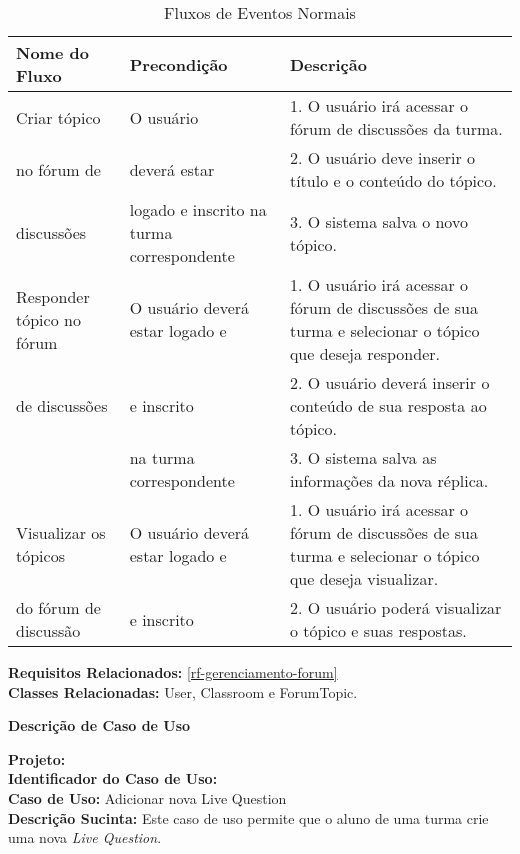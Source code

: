 \begin{table}[H]
	\centering \vspace{0.5cm} \footnotesize
	\caption{Fluxos de Eventos Normais}
	\begin{tabular}{|p{2.3cm}|p{2.5cm}|p{10cm}|} \hline  \rowcolor[rgb]{0.8,0.8,0.8}
		
		Nome do Fluxo & Precondição & Descrição  \\ \hline		
		
		Criar tópico & O usuário & 1. O usuário irá acessar o fórum de discussões da turma.  \\
		no fórum de     & deverá estar  & 2. O usuário deve inserir o título e o conteúdo do tópico.\\
		discussões    & logado e inscrito na turma correspondente & 3. O sistema salva o novo tópico.\\ \hline 
		
		Responder tópico no fórum & O usuário deverá estar logado e & 1. O usuário irá acessar o fórum de discussões de sua turma e selecionar o tópico que deseja responder.  \\
		de discussões    &   e inscrito & 2. O usuário deverá inserir o conteúdo de sua resposta ao tópico.\\
		{}    & na turma correspondente & 3. O sistema salva as informações da nova réplica. \\  \hline 
		
		Visualizar os tópicos & O usuário deverá estar logado e & 1. O usuário irá acessar o fórum de discussões de sua turma e selecionar o tópico que deseja visualizar.  \\
	 	do fórum de discussão    &   e inscrito & 2. O usuário poderá visualizar o tópico e suas respostas. \\ \hline 
		
		
	\end{tabular}
\end{table}


\noindent  \textbf{Requisitos Relacionados:} \ref{rf-gerenciamento-forum}       \\ \textbf{Classes Relacionadas:} User, Classroom e ForumTopic.

\newpage
\clearpage
\begin{flushright}    \textbf{Descrição de Caso de Uso}   \end{flushright}         
\noindent \textbf{Projeto:} \imprimirtitulo  \\
\textbf{Identificador do Caso de Uso:} \UC\label{uc-adicionar-livequestion} \\
\textbf{Caso de Uso:} Adicionar nova Live Question \\
\noindent \textbf{Descrição Sucinta:} Este caso de uso permite que o aluno de uma turma crie uma nova \textit{Live Question}.\\

